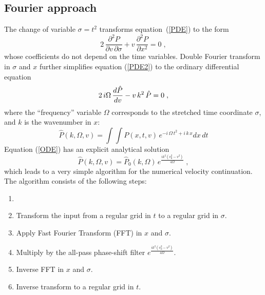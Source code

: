 \subsection{Fourier approach}


The change of variable $\sigma = t^2$ transforms
equation~(\ref{PDE}) to the form
\begin{equation}
  {2\,\frac{\partial^2 P}{\partial v\, \partial \sigma}} +
  {v\,\frac{\partial^2 P}{\partial x^2}} = 0\;,
\label{PDE2}
\end{equation}
whose coefficients do not depend on the time variables.  Double Fourier
transform in $\sigma$ and $x$ further simplifies equation (\ref{PDE2})
to the ordinary differential equation
\begin{equation}
  \label{ODE}
  2\,i\Omega\,{{d \hat{P}} \over {d v}} -
  v\,k^2\,\hat{P} = 0\;,
\end{equation}
where the ``frequency'' variable $\Omega$ corresponds to the stretched time
coordinate $\sigma$, and $k$ is the wavenumber in $x$:
\begin{equation}
\label{FFT}
\hat{P}(k,\Omega,v) = \int\!\!\int P(x,t,v)\,
e^{-i\,\Omega\,t^2 + i\,k\,x} d x\,dt
\end{equation}
Equation (\ref{ODE}) has
an explicit analytical solution
\begin{equation}
  \label{ODEsol}
  \hat{P} (k,\Omega,v) = \hat{P}_0 (k,\Omega)\,
  e^{\frac{i k^2(v_0^2-v^2)}{4\Omega}}\;,
\end{equation}
which leads to a very simple algorithm for the numerical velocity
continuation. The algorithm consists of the following steps:
\begin{enumerate}
\item {}
\item Transform the input from a regular grid in $t$ to a regular grid
  in $\sigma$.
\item Apply Fast Fourier Transform (FFT) in $x$ and $\sigma$.
\item Multiply by the all-pass phase-shift filter $e^{\frac{i
      k^2(v_0^2-v^2)}{4\Omega}}$.
\item Inverse FFT in $x$ and $\sigma$.
\item Inverse transform to a regular grid in $t$.
\end{enumerate}


